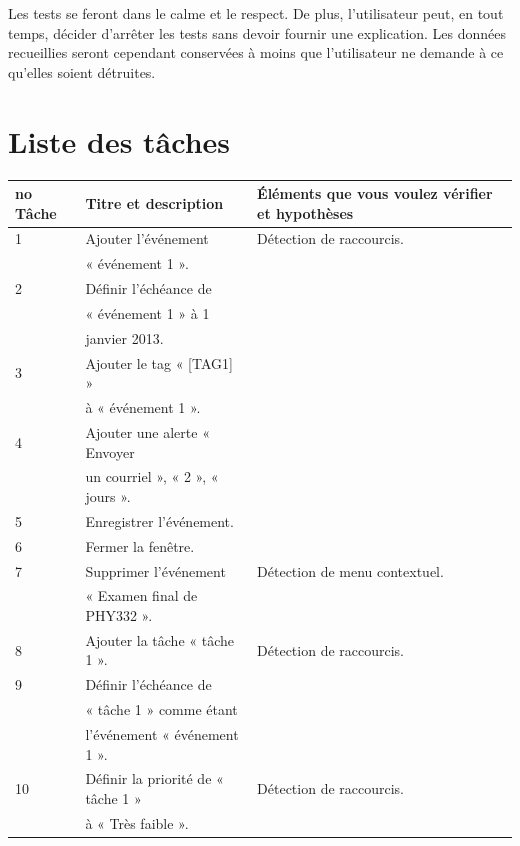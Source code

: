 \documentclass[letterpaper, oneside, 12pt, these, creativecommons]{thETS}
\begin{document}
Les tests se feront dans le calme et le respect. De plus, l'utilisateur peut, en tout temps, décider d'arrêter les tests sans devoir fournir une explication. Les données recueillies seront cependant conservées à moins que l'utilisateur ne demande à ce qu'elles soient détruites.

\newpage

\section{Liste des tâches}

\begin{table}
	\centering
	\begin{tabular}{|l|l|l|}
		\hline
		no Tâche	& Titre et description		& Éléments que vous voulez vérifier et hypothèses 	\\ \hline 
		1		& Ajouter l'événement 		&  Détection de raccourcis.				\\ 
				& « événement 1 ».			&								\\ \hline
		2		& Définir l’échéance de 		&								\\
				& « événement 1 » à 1 		&								\\
				& janvier 2013.			&								\\ \hline
		3		& Ajouter le tag « [TAG1] » 	&								\\
				& à « événement 1 ».		&								\\ \hline
		4		& Ajouter une alerte « Envoyer 	&								\\
				& un courriel », « 2 », « jours ».	&								\\ \hline
		5		& Enregistrer l’événement.	& 								\\ \hline
		6		& Fermer la fenêtre.		&								\\ \hline
		7		& Supprimer l’événement		& Détection de menu contextuel.				\\
				&  « Examen final de PHY332 ».	& 								\\ \hline
		8		& Ajouter la tâche « tâche 1 ». 	& Détection de raccourcis.					\\ \hline
		9		& Définir l’échéance de  		&								\\
				& « tâche 1 » comme étant	&								\\
				&  l’événement « événement 1 ».	&								\\ \hline
		10		& Définir la priorité de  « tâche 1 »& Détection de raccourcis.				\\
				&  à « Très faible ». 		&								\\

\end{tabular}
\end{table}
\end{document}
